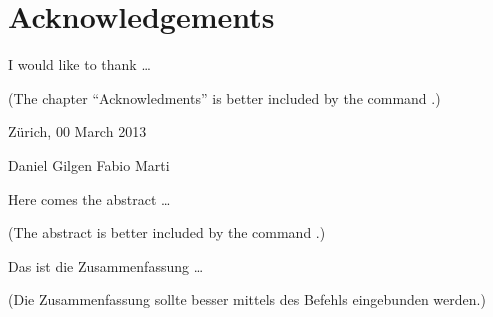 \documentclass[11pt,a4paper,twoside]{report}
\begin{document}
\cleardoublepage

\chapter*{Acknowledgements}
I would like to thank \ldots

(The chapter ``Acknowledments'' is better included by the command
\verb||.)

\vspace{11mm}
\noindent
Zürich, 00 March 2013

\vspace{19mm}
\noindent
Daniel Gilgen \hfill Fabio Marti \hfill \null
\cleardoublepage

\thispagestyle{empty}
\begin{center} \huge \bfseries \abstractname \end{center}
Here comes the abstract \ldots

(The abstract is better included by the command \verb||.)
\clearpage

\thispagestyle{empty}
\begin{otherlanguage}{ngerman}
  \begin{center} \huge \bfseries \abstractname \end{center}
  Das ist die Zusammenfassung \ldots
  
  (Die Zusammenfassung sollte besser mittels des Befehls \verb||
  eingebunden werden.)
\end{otherlanguage}
\cleardoublepage

\pagestyle{fancy}
\renewcommand{\chaptermark}[1]{\markboth{#1}{}}
\renewcommand{\sectionmark}[1]{\markright{\thesection\ #1}}
\fancyhead{}

\fancyhead[LO]{\scshape \contentsname}
\fancyhead[RE]{\scshape \contentsname}
\tableofcontents
\clearpage

\fancyhead[LO]{\scshape \listfigurename}
\fancyhead[RE]{\scshape \listfigurename}
\listoffigures
\clearpage

\fancyhead[LO]{\scshape \listtablename}
\fancyhead[RE]{\scshape \listtablename}
\listoftables
\cleardoublepage
\end{document}
